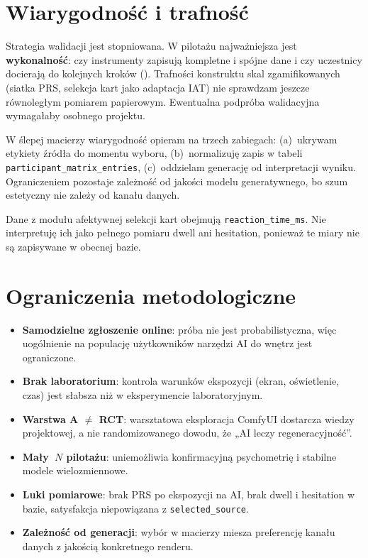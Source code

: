 \section{Wiarygodność i trafność}
\label{ch06:sec:trafnosc}

Strategia walidacji jest stopniowana. W pilotażu najważniejsza jest \textbf{wykonalność}: czy instrumenty zapisują kompletne i spójne dane i czy uczestnicy docierają do kolejnych kroków (). Trafności konstruktu skal zgamifikowanych (siatka PRS, selekcja kart jako adaptacja IAT) nie sprawdzam jeszcze równoległym pomiarem papierowym. Ewentualna podpróba walidacyjna wymagałaby osobnego projektu.

W ślepej macierzy wiarygodność opieram na trzech zabiegach: (a)~ukrywam etykiety źródła do momentu wyboru, (b)~normalizuję zapis w tabeli \allowbreak\texttt{participant\_matrix\_entries}, (c)~oddzielam generację od interpretacji wyniku. Ograniczeniem pozostaje zależność od jakości modelu generatywnego, bo szum estetyczny nie zależy od kanału danych.

Dane z modułu afektywnej selekcji kart obejmują \texttt{reaction\_time\_ms}. Nie interpretuję ich jako pełnego pomiaru dwell ani hesitation, ponieważ te miary nie są zapisywane w obecnej bazie.

\section{Ograniczenia metodologiczne}
\label{ch06:sec:ograniczenia}

\begin{itemize}
  \item \textbf{Samodzielne zgłoszenie online}: próba nie jest probabilistyczna, więc uogólnienie na populację użytkowników narzędzi AI do wnętrz jest ograniczone.
  \item \textbf{Brak laboratorium}: kontrola warunków ekspozycji (ekran, oświetlenie, czas) jest słabsza niż w eksperymencie laboratoryjnym.
  \item \textbf{Warstwa A $\neq$ RCT}: warsztatowa eksploracja ComfyUI dostarcza wiedzy projektowej, a nie randomizowanego dowodu, że „AI leczy regeneracyjność”.
  \item \textbf{Mały~$N$ pilotażu}: uniemożliwia konfirmacyjną psychometrię i stabilne modele wielozmiennowe.
  \item \textbf{Luki pomiarowe}: brak PRS po ekspozycji na AI, brak dwell i hesitation w bazie, satysfakcja niepowiązana z \texttt{selected\_source}.
  \item \textbf{Zależność od generacji}: wybór w macierzy miesza preferencję kanału danych z jakością konkretnego renderu.
\end{itemize}

